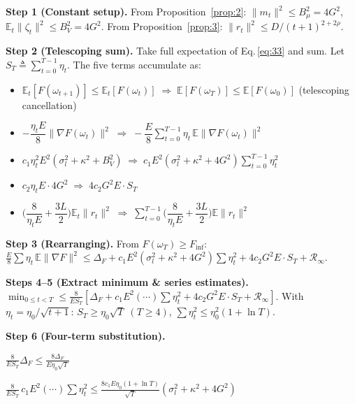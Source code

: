 \noindent\textbf{Step 1 (Constant setup).}
From Proposition~\ref{prop:2}: \(\|m_t\|^2 \le B_\mu^2 = 4G^2\),
\(\mathbb E_t\|\zeta_t\|^2 \le B_V^2 = 4G^2\).
From Proposition~\ref{prop:3}: \(\|r_t\|^2 \le D/(t+1)^{2+2\rho}\).

\noindent\textbf{Step 2 (Telescoping sum).}
Take full expectation of Eq.\,\eqref{eq:33} and sum.
Let \(S_T \triangleq \sum_{t=0}^{T-1}\eta_t\).
The five terms accumulate as:
\begin{itemize}[leftmargin=*,nosep]
  \item \(\mathbb E_t[F(\omega_{t+1})] \le \mathbb E_t[F(\omega_t)]
        \;\Longrightarrow\; \mathbb E[F(\omega_T)] \le \mathbb E[F(\omega_0)]\)
        (telescoping cancellation)
  \item \(-\dfrac{\eta_t E}{8}\|\nabla F(\omega_t)\|^2
        \;\Longrightarrow\; -\dfrac{E}{8}\sum_{t=0}^{T-1}\eta_t\,\mathbb E\|\nabla F(\omega_t)\|^2\)
  \item \(c_1\eta_t^2 E^2(\sigma_l^2 + \kappa^2 + B_V^2)
        \;\Longrightarrow\; c_1 E^2(\sigma_l^2 + \kappa^2 + 4G^2)\sum_{t=0}^{T-1}\eta_t^2\)
  \item \(c_2\eta_t E \cdot 4G^2
        \;\Longrightarrow\; 4c_2 G^2 E \cdot S_T\)
  \item \(\bigl(\dfrac{8}{\eta_t E} + \dfrac{3L}{2}\bigr)\mathbb E_t\|r_t\|^2
        \;\Longrightarrow\; \sum_{t=0}^{T-1}\bigl(\dfrac{8}{\eta_t E} + \dfrac{3L}{2}\bigr)\mathbb E\|r_t\|^2\)
\end{itemize}

\noindent\textbf{Step 3 (Rearranging).}
From \(F(\omega_T) \ge F_{\inf}\):
\(\frac{E}{8}\sum\eta_t\,\mathbb E\|\nabla F\|^2
 \le \Delta_F + c_1 E^2(\sigma_l^2 + \kappa^2 + 4G^2)\sum\eta_t^2
    + 4c_2 G^2 E \cdot S_T + \mathcal R_\infty\).

\noindent\textbf{Steps 4--5 (Extract minimum \& series estimates).}
\(\min_{0\le t<T} \le \frac{8}{E S_T}[\Delta_F + c_1 E^2(\cdots)\sum\eta_t^2 + 4c_2 G^2 E \cdot S_T + \mathcal R_\infty]\).
With \(\eta_t = \eta_0/\sqrt{t+1}\):
\(S_T \ge \eta_0\sqrt{T}\;(T\ge 4)\), \(\sum\eta_t^2 \le \eta_0^2(1 + \ln T)\).

\noindent\textbf{Step 6 (Four-term substitution).}

\(\displaystyle\frac{8}{E S_T}\Delta_F \le \frac{8\Delta_F}{E\eta_0\sqrt{T}}\)

\(\displaystyle\frac{8}{E S_T}\,c_1 E^2(\cdots)\sum\eta_t^2
           \le \frac{8c_1 E\eta_0(1+\ln T)}{\sqrt{T}}(\sigma_l^2 + \kappa^2 + 4G^2)\)

